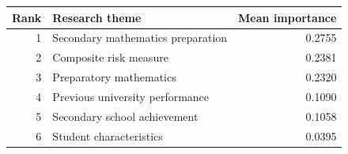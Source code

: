 \begin{tabular}{rlr}
\toprule
Rank & Research theme & Mean importance \\
\midrule
1 & Secondary mathematics preparation & 0.2755 \\
2 & Composite risk measure & 0.2381 \\
3 & Preparatory mathematics & 0.2320 \\
4 & Previous university performance & 0.1090 \\
5 & Secondary school achievement & 0.1058 \\
6 & Student characteristics & 0.0395 \\
\bottomrule
\end{tabular}
